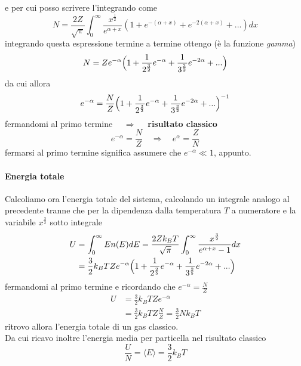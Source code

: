 e per cui posso scrivere l'integrando come
\begin{equation}
N = \frac{2Z}{\sqrt{\pi}} \int_0^{\infty} \frac{x^{ \frac{1}{2} }}{e^{ \alpha + x }} (1 + e^{ - (\alpha + x) } + e^{ - 2 (\alpha + x) } + ... ) dx
\end{equation}
integrando questa espressione termine a termine ottengo (è la funzione \textit{gamma})
\begin{equation}
N = Z e^{ -\alpha } \Bigl(  1 + \frac{1}{2^{\frac{3}{2}}}e^{ -\alpha } + \frac{1}{3^{\frac{3}{2}}} e^{ -2\alpha } + ...  \Bigr)
\end{equation}
da cui allora 
\begin{equation}
e^{ -\alpha } = \frac{N}{Z} \Bigl(  1 + \frac{1}{2^{\frac{3}{2}}}e^{ -\alpha } + \frac{1}{3^{\frac{3}{2}}} e^{ -2\alpha } + ...  \Bigr)^{ -1 }
\end{equation}
fermandomi al primo termine $\quad\Rightarrow\quad $ \textbf{risultato classico}
\begin{equation}
e^{ -\alpha } = \frac{N}{Z} \quad\Rightarrow\quad e^{ \alpha } = \frac{Z}{N}
\end{equation}
fermarsi al primo termine significa assumere che $e^{ -\alpha } \ll 1$, appunto.


\paragraph{Energia totale} Calcoliamo ora l'energia totale del sistema, calcolando un integrale analogo al precedente tranne che per la dipendenza dalla temperatura $T$ a numeratore e la variabile $x^{ \frac{3}{2} }$ sotto integrale
\begin{equation}
\begin{split}
U & = \int_0^{\infty} E n(E)dE = \frac{2Zk_B T}{\sqrt{\pi}} \int_0^{\infty} \frac{x^{ \frac{3}{2} }}{e^{ \alpha + x } - 1 } dx \\
& = \frac{3}{2} k_B T Z e^{ -\alpha } \Bigl(  1 + \frac{1}{2^{ \frac{2}{5} }} e^{ -\alpha } +  \frac{1}{3^{ \frac{2}{5} }} e^{ -2 \alpha } + ... \Bigr)
\end{split}
\end{equation}
fermandomi al primo termine e ricordando che $e^{ -\alpha } = \frac{N}{Z}$
\begin{equation}
\begin{split}
U & = \frac{3}{2} k_B T Z e^{ -\alpha } \\
& = \frac{3}{2} k_B T Z \frac{N}{Z} = \frac{3}{2} N k_B T
\end{split}
\end{equation}
ritrovo allora l'energia totale di un gas classico. \\
Da cui ricavo inoltre l'energia media per particella nel risultato classico
\begin{equation}
\frac{U}{N} = \langle E \rangle = \frac{3}{2} k_B T
\end{equation}

